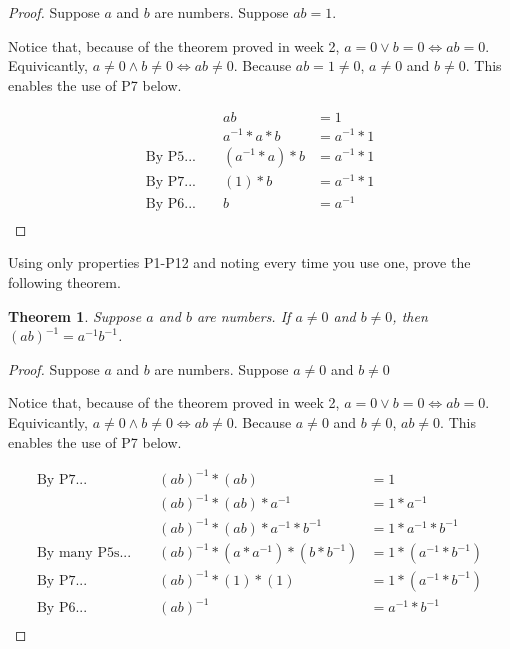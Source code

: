 \documentclass{article} %
\theoremstyle{plain}
\newtheorem*{theorem*}{Theorem}
\begin{document}
\begin{proof} Suppose $a$ and $b$ are numbers. Suppose $ab=1$.

    Notice that, because of the theorem proved in week 2, $a=0 \lor b=0 \iff ab=0$.  Equivicantly, $a \neq 0 \land b \neq 0 \iff ab \neq 0$. Because $ab=1 \neq 0$, $a \neq 0$ and $b \neq 0$. This enables the use of P7 below.

    \begin{align*}
        & & ab &= 1 \\
        & & a^{-1} * a * b &= a^{-1} * 1 \\
        \text{By P5... } & & (a^{-1} * a) * b &= a^{-1} * 1 \\
        \text{By P7... } & & (1) * b &= a^{-1} * 1 \\
        \text{By P6... } & & b &= a^{-1} \\
    \end{align*}
\end{proof} 

\noindent{} Using only properties P1-P12 and noting every time you use one, prove the following theorem. 

\begin{theorem*}
Suppose $a$ and $b$ are numbers. If $a \neq 0$ and $b \neq 0$, then $(a b)^{-1} = a^{-1} b^{-1}$. 
\end{theorem*}


\begin{proof} Suppose $a$ and $b$ are numbers. Suppose $a \neq 0$ and $b \neq 0$

    Notice that, because of the theorem proved in week 2, $a=0 \lor b=0 \iff ab=0$.  Equivicantly, $a \neq 0 \land b \neq 0 \iff ab \neq 0$. Because $a \neq 0$ and $b \neq 0$, $ab \neq 0$. This enables the use of P7 below.

    \begin{align*}
        \text{By P7... } & & (ab)^{-1} * (ab) &= 1 \\
        & & (ab)^{-1} * (ab) * a^{-1} &= 1 * a^{-1} \\
        & & (ab)^{-1} * (ab) * a^{-1} * b^{-1} &= 1 * a^{-1} * b^{-1} \\
        \text{By many P5s... } & & (ab)^{-1} * (a * a^{-1}) * (b * b^{-1}) &= 1 * (a^{-1} * b^{-1}) \\
        \text{By P7... } & & (ab)^{-1} * (1) * (1) &= 1 * (a^{-1} * b^{-1}) \\
        \text{By P6... } & & (ab)^{-1} &= a^{-1} * b^{-1} \\
    \end{align*}
\end{proof} 
\end{document}
